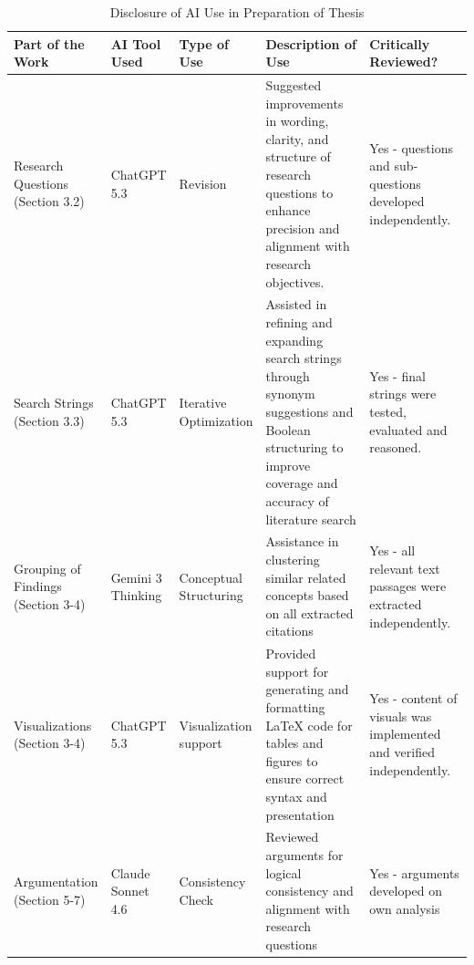 \documentclass[12pt,oneside]{article}
\begin{document}
\begin{table}[h]
\centering
\begin{tabular}{|p{0.17\linewidth}|p{0.10\linewidth}|p{0.15\linewidth}|p{0.30\linewidth}|p{0.28\linewidth}|}
\hline
\textbf{Part of the Work} & \textbf{AI Tool Used} & \textbf{Type of Use} & \textbf{Description of Use} & \textbf{Critically Reviewed?} \\
\hline
Research Questions (Section 3.2) & ChatGPT 5.3 & Revision & Suggested improvements in wording, clarity, and structure of research questions to enhance precision and alignment with research objectives. & Yes - questions and sub-questions developed independently.\\
\hline
Search Strings (Section 3.3) & ChatGPT 5.3 & Iterative Optimization & Assisted in refining and expanding search strings through synonym suggestions and Boolean structuring to improve coverage and accuracy of literature search & Yes -  final strings were tested, evaluated and reasoned. \\
\hline
Grouping of Findings (Section 3-4) & Gemini 3 Thinking & Conceptual Structuring & Assistance in clustering similar related concepts based on all extracted citations & Yes - all relevant text passages were extracted independently. \\
\hline
Visualizations (Section 3-4) & ChatGPT 5.3 & Visualization support & Provided support for generating and formatting LaTeX code for tables and figures to ensure correct syntax and presentation & Yes - content of visuals was implemented and verified independently. \\
\hline
Argumentation (Section 5-7) & Claude Sonnet 4.6 & Consistency Check & Reviewed arguments for logical consistency and alignment with research questions & Yes - arguments developed on own analysis \\
\hline
\end{tabular}
\caption{Disclosure of AI Use in Preparation of Thesis}
\label{tab:aiuse}
\end{table}

\end{document}
